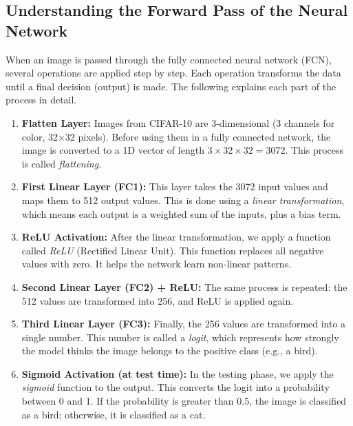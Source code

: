 \subsection{Understanding the Forward Pass of the Neural Network}

When an image is passed through the fully connected neural network (FCN), several operations are applied step by step. Each operation transforms the data until a final decision (output) is made. The following explains each part of the process in detail.

\begin{enumerate}
    \item \textbf{Flatten Layer:} 
    Images from CIFAR-10 are 3-dimensional (3 channels for color, 32×32 pixels). Before using them in a fully connected network, the image is converted to a 1D vector of length $3 \times 32 \times 32 = 3072$. This process is called \textit{flattening}.

    \item \textbf{First Linear Layer (FC1):}
    This layer takes the 3072 input values and maps them to 512 output values. This is done using a \textit{linear transformation}, which means each output is a weighted sum of the inputs, plus a bias term.

    \item \textbf{ReLU Activation:} 
    After the linear transformation, we apply a function called \textit{ReLU} (Rectified Linear Unit). This function replaces all negative values with zero. It helps the network learn non-linear patterns.

    \item \textbf{Second Linear Layer (FC2) + ReLU:} 
    The same process is repeated: the 512 values are transformed into 256, and ReLU is applied again.

    \item \textbf{Third Linear Layer (FC3):} 
    Finally, the 256 values are transformed into a single number. This number is called a \textit{logit}, which represents how strongly the model thinks the image belongs to the positive class (e.g., a bird).

    \item \textbf{Sigmoid Activation (at test time):} 
    In the testing phase, we apply the \textit{sigmoid} function to the output. This converts the logit into a probability between 0 and 1. If the probability is greater than 0.5, the image is classified as a bird; otherwise, it is classified as a cat.
\end{enumerate}

